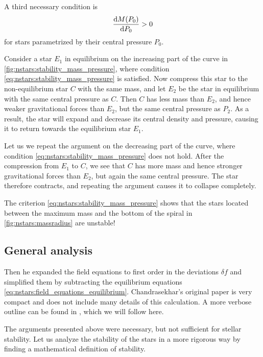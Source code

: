 A third necessary condition is
\begin{equation}
	\odv{M(P_0)}{P_0} > 0
\label{eq:nstars:stability_mass_pressure}
\end{equation}
for stars parametrized by their central pressure $P_0$.

Consider a star $E_1$ in equilibrium on the increasing part of the curve in \cref{fig:nstars:stability_mass_pressure}, where condition \eqref{eq:nstars:stability_mass_pressure} is satisfied.
Now compress this star to the non-equilibrium star $C$ with the same mass, and let $E_2$ be the star in equilibrium with the same central pressure as $C$.
Then $C$ has less mass than $E_2$, and hence weaker gravitational forces than $E_2$, but the same central pressure as $P_2$.
As a result, the star will expand and decrease its central density and pressure, causing it to return towards the equilibrium star $E_1$.

Let us we repeat the argument on the decreasing part of the curve, where condition \eqref{eq:nstars:stability_mass_pressure} does not hold.
After the compression from $E_1$ to $C$, we see that $C$ has more mass and hence stronger gravitational forces than $E_2$, but again the same central pressure.
The star therefore contracts, and repeating the argument causes it to collapse completely.

The criterion \eqref{eq:nstars:stability_mass_pressure} shows that the stars located between the maximum mass and the bottom of the spiral in \cref{fig:nstars:massradius} are unstable!

\subsection{General analysis}
\label{sec:nstars:stability_general}

Then he expanded the field equations to first order in the deviations $\delta f$ and simplified them by subtracting the equilibrium equations \eqref{eq:nstars:field_equations_equilibrium}.
Chandrasekhar's original paper \cite{ref:chandrasekhar_stability} is very compact and does not include many details of this calculation.
A more verbose outline can be found in \cite[§ 26.4d]{ref:mtw}, which we will follow here.


The arguments presented above were necessary, but not sufficient for stellar stability.
Let us analyze the stability of the stars in a more rigorous way by finding a mathematical definition of stability.


